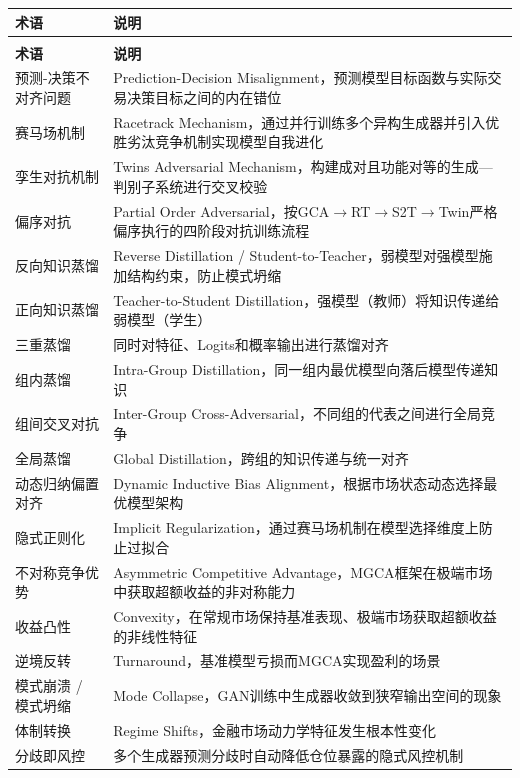 \begin{longtable}{>{\raggedright\arraybackslash}p{4.5cm} p{9.5cm}}
\toprule
\textbf{术语} & \textbf{说明} \\
\midrule
\endfirsthead
\multicolumn{2}{c}{\tablename\ -- 续表} \\
\toprule
\textbf{术语} & \textbf{说明} \\
\midrule
\endhead
\bottomrule
\endlastfoot

预测-决策不对齐问题 & Prediction-Decision Misalignment，预测模型目标函数与实际交易决策目标之间的内在错位 \\
赛马场机制 & Racetrack Mechanism，通过并行训练多个异构生成器并引入优胜劣汰竞争机制实现模型自我进化 \\
孪生对抗机制 & Twins Adversarial Mechanism，构建成对且功能对等的生成—判别子系统进行交叉校验 \\
偏序对抗 & Partial Order Adversarial，按GCA$\to$RT$\to$S2T$\to$Twin严格偏序执行的四阶段对抗训练流程 \\
反向知识蒸馏 & Reverse Distillation / Student-to-Teacher，弱模型对强模型施加结构约束，防止模式坍缩 \\
正向知识蒸馏 & Teacher-to-Student Distillation，强模型（教师）将知识传递给弱模型（学生） \\
三重蒸馏 & 同时对特征、Logits和概率输出进行蒸馏对齐 \\
组内蒸馏 & Intra-Group Distillation，同一组内最优模型向落后模型传递知识 \\
组间交叉对抗 & Inter-Group Cross-Adversarial，不同组的代表之间进行全局竞争 \\
全局蒸馏 & Global Distillation，跨组的知识传递与统一对齐 \\
动态归纳偏置对齐 & Dynamic Inductive Bias Alignment，根据市场状态动态选择最优模型架构 \\
隐式正则化 & Implicit Regularization，通过赛马场机制在模型选择维度上防止过拟合 \\
不对称竞争优势 & Asymmetric Competitive Advantage，MGCA框架在极端市场中获取超额收益的非对称能力 \\
收益凸性 & Convexity，在常规市场保持基准表现、极端市场获取超额收益的非线性特征 \\
逆境反转 & Turnaround，基准模型亏损而MGCA实现盈利的场景 \\
模式崩溃 / 模式坍缩 & Mode Collapse，GAN训练中生成器收敛到狭窄输出空间的现象 \\
体制转换 & Regime Shifts，金融市场动力学特征发生根本性变化 \\
分歧即风控 & 多个生成器预测分歧时自动降低仓位暴露的隐式风控机制 \\

\end{longtable}
